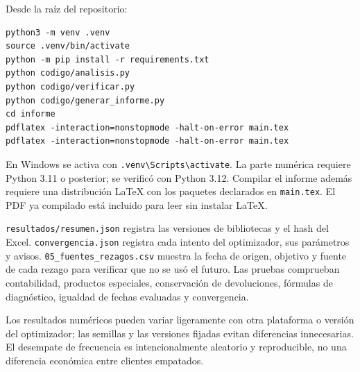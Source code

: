 \documentclass[11pt,letterpaper]{article}
\begin{document}
Desde la raíz del repositorio:
\begin{verbatim}
python3 -m venv .venv
source .venv/bin/activate
python -m pip install -r requirements.txt
python codigo/analisis.py
python codigo/verificar.py
python codigo/generar_informe.py
cd informe
pdflatex -interaction=nonstopmode -halt-on-error main.tex
pdflatex -interaction=nonstopmode -halt-on-error main.tex
\end{verbatim}
En Windows se activa con \texttt{.venv\textbackslash Scripts\textbackslash activate}. La parte numérica requiere Python 3.11 o posterior; se verificó con Python 3.12. Compilar el informe además requiere una distribución LaTeX con los paquetes declarados en \texttt{main.tex}. El PDF ya compilado está incluido para leer sin instalar LaTeX.

\texttt{resultados/resumen.json} registra las versiones de bibliotecas y el hash del Excel. \texttt{convergencia.json} registra cada intento del optimizador, sus parámetros y avisos. \texttt{05\_fuentes\_rezagos.csv} muestra la fecha de origen, objetivo y fuente de cada rezago para verificar que no se usó el futuro. Las pruebas comprueban contabilidad, productos especiales, conservación de devoluciones, fórmulas de diagnóstico, igualdad de fechas evaluadas y convergencia.

Los resultados numéricos pueden variar ligeramente con otra plataforma o versión del optimizador; las semillas y las versiones fijadas evitan diferencias innecesarias. El desempate de frecuencia es intencionalmente aleatorio y reproducible, no una diferencia económica entre clientes empatados.
\end{document}
